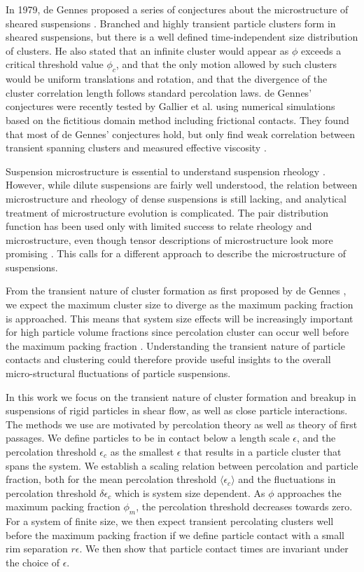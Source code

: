 \documentclass[aps,pre,twocolumn,letterpaper,floatfix,showpacs]{revtex4}
\begin{document}
In 1979, de Gennes proposed a series of conjectures about the microstructure of sheared suspensions \cite{de1979conjectures}. Branched and highly transient particle clusters form in sheared suspensions, but there is a well defined time-independent size distribution of clusters. He also stated that an infinite cluster would appear as $\phi$ exceeds 
a critical threshold value $\phi_c$, and that the only motion allowed by such clusters would be uniform translations and rotation, and that the divergence of the cluster correlation length follows standard percolation laws.  de Gennes' conjectures were recently tested by Gallier et al. using numerical simulations based on the fictitious domain method including frictional contacts. They found that most of de Gennes' conjectures hold, but only find weak correlation between transient spanning clusters and measured effective viscosity \cite{gallier2015percolation}.

Suspension microstructure is essential to understand suspension rheology \cite{stickel2005fluid,morris2009review}. However, while dilute suspensions are fairly well understood, the relation between microstructure and rheology of dense suspensions is still lacking, and analytical treatment of microstructure evolution is complicated. The pair distribution function has been used only with limited success to relate rheology and microstructure, even though tensor descriptions of microstructure look more promising \cite{stickel2005fluid}. This calls for a different approach to describe the microstructure of suspensions.

From the transient nature of cluster formation as first proposed by de Gennes \cite{de1979conjectures}, we expect the maximum cluster size to diverge as the maximum packing fraction is approached. This means that system size effects will be increasingly important for high particle volume fractions since percolation cluster can occur well before the maximum packing fraction \cite{gallier2015percolation}. Understanding the transient nature of particle contacts and clustering could therefore provide useful insights to the overall micro-structural fluctuations of particle suspensions.

In this work we focus on the transient nature of cluster formation and breakup in suspensions of rigid particles in shear flow, as well as close particle interactions. The methods we use are motivated by percolation theory as well as theory of first passages. We define particles to be in contact below a length scale $\epsilon$, and the percolation threshold $\epsilon_c$ as the smallest $\epsilon$ that results in a particle cluster that spans the system. We establish a scaling relation between percolation and particle fraction, both for the mean percolation threshold $\langle \epsilon_c \rangle$ and the fluctuations in percolation threshold $\delta \epsilon_c$ which is system size dependent. As $\phi$ approaches the maximum packing fraction $\phi_m$, the percolation threshold decreases towards zero. For a system of finite size, we then expect transient percolating clusters well before the maximum packing fraction if we define particle contact with a small rim separation $r\epsilon$. We then show that particle contact times are invariant under the choice of $\epsilon$.
\end{document}
